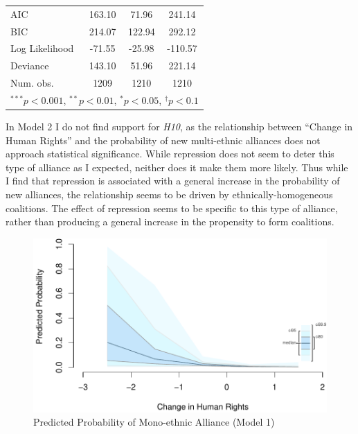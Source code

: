 \documentclass[12pt,]{book}
\let\origtable\table
\let\endorigtable\endtable
\renewenvironment{table}[1][2] {
    \singlespacing
    \expandafter\origtable\expandafter[H]
} {
    \endorigtable
}
\theoremstyle{definition}
\theoremstyle{definition}
\theoremstyle{remark}
\begin{document}
\begin{table}
\begin{center}
\begin{tabular}{l c c c }
AIC                               & 163.10            & 71.96     & 241.14            \\
BIC                               & 214.07            & 122.94    & 292.12            \\
Log Likelihood                    & -71.55            & -25.98    & -110.57           \\
Deviance                          & 143.10            & 51.96     & 221.14            \\
Num. obs.                         & 1209              & 1210      & 1210              \\
\hline
\multicolumn{4}{l}{\scriptsize{$^{***}p<0.001$, $^{**}p<0.01$, $^*p<0.05$, $^{\dagger}p<0.1$}}
\end{tabular}
\caption{Rare Events Logit Models of Alliance Formation}
\label{tab:alliance}
\end{center}
\end{table}

In Model 2 I do not find support for \emph{H10}, as the relationship
between ``Change in Human Rights'' and the probability of new
multi-ethnic alliances does not approach statistical significance. While
repression does not seem to deter this type of alliance as I expected,
neither does it make them more likely. Thus while I find that repression
is associated with a general increase in the probability of new
alliances, the relationship seems to be driven by ethnically-homogeneous
coalitions. The effect of repression seems to be specific to this type
of alliance, rather than producing a general increase in the propensity
to form coalitions.

\begin{figure}
\centering
\includegraphics{realignment_standalone_files/figure-latex/zeligplot-1.pdf}
\caption{\label{fig:zeligplot}Predicted Probability of Mono-ethnic Alliance
(Model 1)}
\end{figure}
\end{document}
